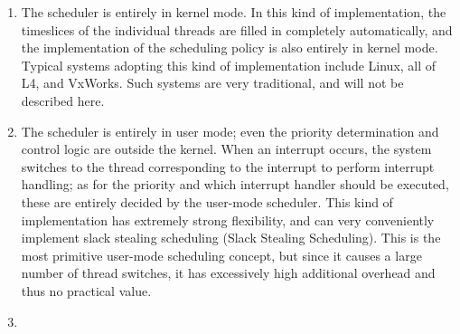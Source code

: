 \begin{enumerate}
\def\labelenumi{\arabic{enumi}.}
\item
  The scheduler is entirely in kernel mode. In this kind of implementation, the timeslices of the individual threads are filled in completely automatically, and the implementation of the scheduling policy is also entirely in kernel mode. Typical systems adopting this kind of implementation include Linux, all of L4, and VxWorks. Such systems are very traditional, and will not be described here.
\item
  The scheduler is entirely in user mode; even the priority determination and control logic are outside the kernel. When an interrupt occurs, the system switches to the thread corresponding to the interrupt to perform interrupt handling; as for the priority and which interrupt handler should be executed, these are entirely decided by the user-mode scheduler. This kind of implementation has extremely strong flexibility, and can very conveniently implement slack stealing scheduling (Slack
  Stealing
  Scheduling). This is the most primitive user-mode scheduling concept, but since it causes a large number of thread switches, it has excessively high additional overhead and thus no practical value.
\item

\end{enumerate}
